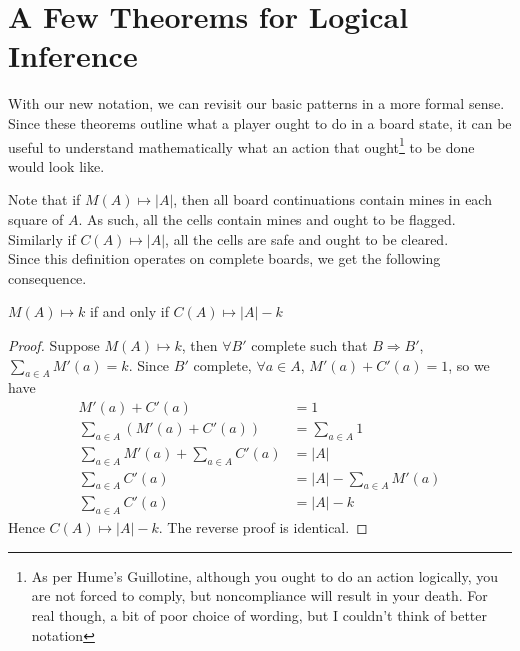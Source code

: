 \section{A Few Theorems for Logical Inference}\label{sec:theorems}

With our new notation, we can revisit our basic patterns in a more formal sense. Since these theorems outline what a player ought to do in a board state, it can be useful to understand mathematically what an action that ought\footnote{As per Hume's Guillotine, although you ought to do an action logically, you are not forced to comply, but noncompliance will result in your death. For real though, a bit of poor choice of wording, but I couldn't think of better notation} to be done would look like.


Note that if $M(A)\mapsto|A|$, then all board continuations contain mines in each square of $A$. As such, all the cells contain mines and ought to be flagged. Similarly if $C(A)\mapsto|A|$, all the cells are safe and ought to be cleared.\\

Since this definition operates on complete boards, we get the following consequence.
\begin{proposition}\label{thm:m=s-c}
$M(A)\mapsto k$ if and only if $C(A)\mapsto |A|-k$
\end{proposition}
\begin{proof}
    Suppose $M(A)\mapsto k$, then $\forall B'$ complete such that $B\Rightarrow B'$, $\sum_{a\in A}M'(a)=k$. Since $B'$ complete, $\forall a\in A$, $M'(a)+C'(a)=1$, so we have\begin{align*}
        M'(a)+C'(a)&=1\\
        \sum_{a\in A}(M'(a)+C'(a))&=\sum_{a\in A}1\\
        \sum_{a\in A}M'(a)+\sum_{a\in A}C'(a)&=|A|\\
        \sum_{a\in A}C'(a)&=|A|-\sum_{a\in A}M'(a)\\
        \sum_{a\in A}C'(a)&=|A|-k
    \end{align*}
    Hence $C(A)\mapsto|A|-k$. The reverse proof is identical.
\end{proof}

